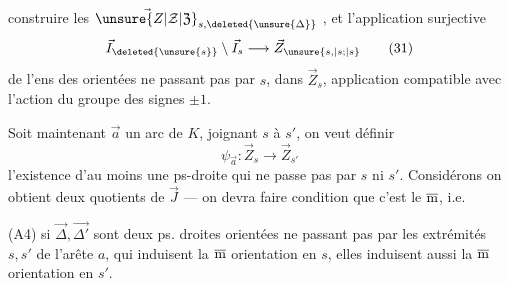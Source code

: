 construire les $\vec{\unsure{Z|\mathcal Z|\mathfrak Z}}_{s,\deleted{\unsure{\Delta}}}$ , et l'application
surjective
\[\vec I_{\deleted{\unsure{s}}}\setminus\vec I_s\longrightarrow\vec Z_{\unsure{s,|s;|s}}\tag*{(31)}\]
de l'ens des  orientées ne passant pas
par $s$, dans $\vec Z_s$, application compatible avec
l'action du groupe des signes $\pm1$.

Soit maintenant $\vec a$ un arc de
$K$, joignant $s$ à $s'$, on veut définir
\[\psi_{\vec a}:\vec Z_s\longrightarrow\vec Z_{s'}\]
  l'existence
d'au moins une ps-droite qui ne passe
pas par $s$ ni $s'$. Considérons
on obtient deux quotients de $\vec J$ — on
devra faire condition que c'est le $\overline{\textrm m}$, i.e.

(A4) si $\vec\Delta,\vec{\Delta'}$ sont deux ps. droites orientées
ne passant pas par les extrémités $s,s'$ de
l'arête $a$, qui induisent la $\overline{\textrm m}$ orientation en
$s$, elles induisent aussi la $\overline{\textrm m}$ orientation en $s'$.
